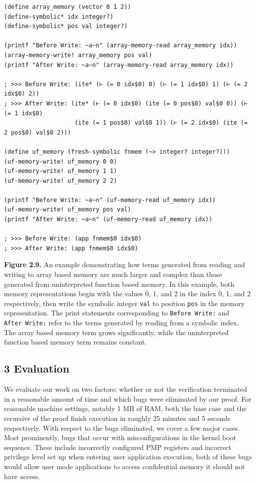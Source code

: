\documentclass[]{article}
\begin{document}
\begin{verbatim}
(define array_memory (vector 0 1 2))
(define-symbolic* idx integer?)
(define-symbolic* pos val integer?)

(printf "Before Write: ~a~n" (array-memory-read array_memory idx))
(array-memory-write! array_memory pos val)
(printf "After Write: ~a~n" (array-memory-read array_memory idx))

; >>> Before Write: (ite* (⊢ (= 0 idx$0) 0) (⊢ (= 1 idx$0) 1) (⊢ (= 2 idx$0) 2))
; >>> After Write: (ite* (⊢ (= 0 idx$0) (ite (= 0 pos$0) val$0 0)) (⊢ (= 1 idx$0)
                    (ite (= 1 pos$0) val$0 1)) (⊢ (= 2 idx$0) (ite (= 2 pos$0) val$0 2)))

(define uf_memory (fresh-symbolic fnmem (~> integer? integer?)))
(uf-memory-write! uf_memory 0 0)
(uf-memory-write! uf_memory 1 1)
(uf-memory-write! uf_memory 2 2)

(printf "Before Write: ~a~n" (uf-memory-read uf_memory idx))
(uf-memory-write! uf_memory pos val)
(printf "After Write: ~a~n" (uf-memory-read uf_memory idx))

; >>> Before Write: (app fnmem$0 idx$0)
; >>> After Write: (app fnmem$0 idx$0)
\end{verbatim}

\textbf{Figure 2.9.} An example demonstrating how terms generated from
reading and writing to array based memory are much larger and complex
than those generated from uninterpreted function based memory. In this
example, both memory representations begin with the values 0, 1, and 2
in the index 0, 1, and 2 respectively, then write the symbolic integer
\texttt{val} to position \texttt{pos} in the memory representation. The
print statements corresponding to \texttt{Before\ Write:} and
\texttt{After\ Write:} refer to the terms generated by reading from a
symbolic index. The array based memory term grows significantly, while
the uninterpreted function based memory term remains constant.

\subsection{3 Evaluation}\label{evaluation}

We evaluate our work on two factors: whether or not the verification
terminated in a reasonable amount of time and which bugs were eliminated
by our proof. For reasonable machine settings, notably 1 MB of RAM, both
the base case and the recursive of the proof finish execution in roughly
25 minutes and 5 seconds respectively. With respect to the bugs
eliminated, we cover a few major cases. Most prominently, bugs that
occur with misconfigurations in the kernel boot sequence. These include
incorrectly configured PMP registers and incorrect privilege level set
up when entering user application execution, both of these bugs would
allow user mode applications to access confidential memory it should not
have access.
\end{document}
